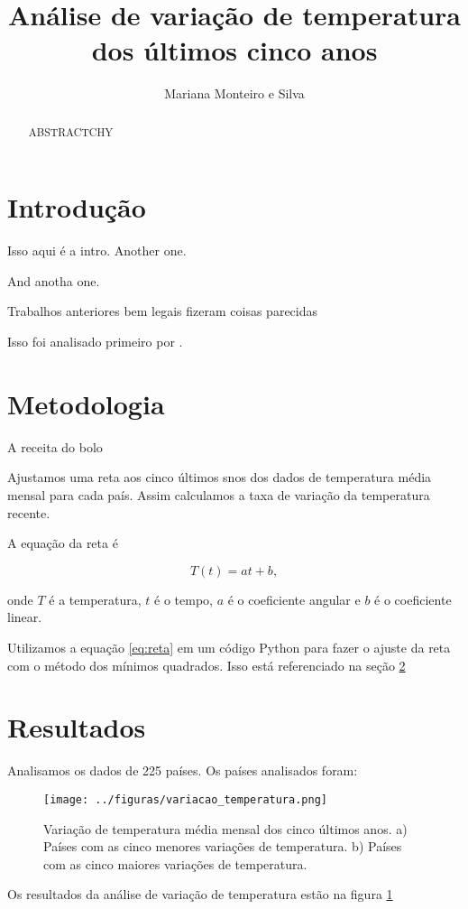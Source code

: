 \documentclass{article} %
\newcommand{\Title}{Análise de variação de temperatura dos últimos cinco anos}
\begin{document}
\title{\Title}
\author{Mariana Monteiro e Silva}
\maketitle



\begin{abstract}
ABSTRACTCHY

\end{abstract}

\section{Introdução}
\label{sec:intro}
Isso aqui é a intro.
Another one.

And anotha one.

Trabalhos anteriores bem legais fizeram coisas parecidas 
\citep{Hansen2010}

Isso foi analisado primeiro por \citet{Hansen2010}.

\section{Metodologia}
\label{sec:metodos}

A receita do bolo

Ajustamos uma reta aos cinco últimos snos dos dados
de temperatura média mensal para cada país.
Assim calculamos a taxa de variação da temperatura recente.

A equação da reta é

\begin{equation}
T(t) = at + b,
\label{eq:reta}
\end{equation}

\noindent
onde $T$ é a temperatura, $t$ é o tempo, $a$ é o coeficiente angular 
e $b$ é o coeficiente linear.

Utilizamos a equação \ref{eq:reta} em um código Python para fazer 
o ajuste da reta com o método dos mínimos quadrados. Isso está referenciado na seção \ref{sec:metodos}

\section{Resultados}
\label{sec:resultados}

Analisamos os dados de 225 países.
Os países analisados foram: \Paises

\begin{figure}
	\centering
	\texttt{[image: ../figuras/variacao\_temperatura.png]}
	\caption{
		Variação de temperatura média mensal dos cinco últimos anos.
		a) Países com as cinco menores variações de temperatura.
		b) Países com as cinco maiores variações de temperatura.
	}
\label{fig:variacao}
\end{figure}


Os resultados da análise de variação de temperatura estão na figura \ref{fig:variacao}





\end{document}
